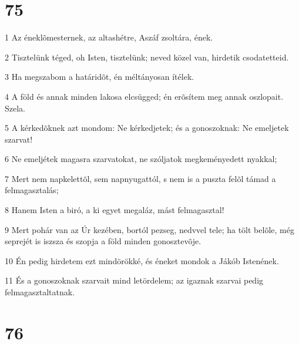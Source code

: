 \chapter{75}

\par 1 Az éneklõmesternek, az altashétre, Aszáf zsoltára, ének.
\par 2 Tisztelünk téged, oh Isten, tisztelünk; neved közel van, hirdetik csodatetteid.
\par 3 Ha megszabom a határidõt, én méltányosan ítélek.
\par 4 A föld és annak minden lakosa elcsügged; én erõsítem meg annak oszlopait. Szela.
\par 5 A kérkedõknek azt mondom: Ne kérkedjetek; és a gonoszoknak: Ne emeljetek szarvat!
\par 6 Ne emeljétek magasra szarvatokat, ne szóljatok megkeményedett nyakkal;
\par 7 Mert nem napkelettõl, sem napnyugattól, s nem is a puszta felõl támad a felmagasztalás;
\par 8 Hanem Isten a biró, a ki egyet megaláz, mást felmagasztal!
\par 9 Mert pohár van az Úr kezében, bortól pezseg, nedvvel tele; ha tölt belõle, még seprejét is iszsza és szopja a föld minden gonosztevõje.
\par 10 Én pedig hirdetem ezt mindörökké, és éneket mondok a Jákób Istenének.
\par 11 És a gonoszoknak szarvait mind letördelem; az igaznak szarvai pedig felmagasztaltatnak.

\chapter{76}

